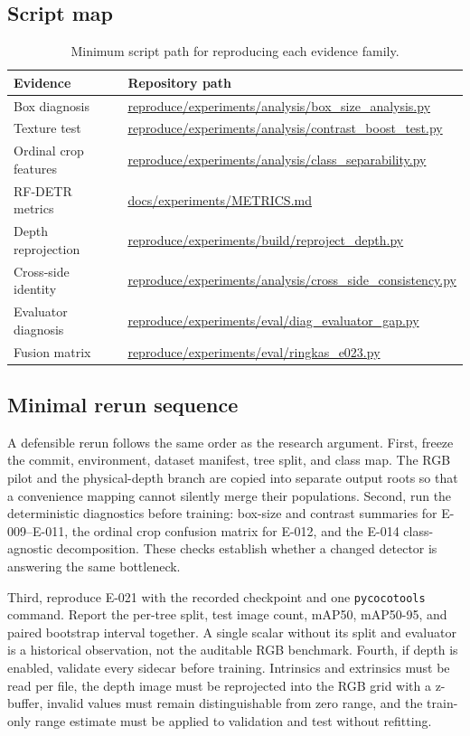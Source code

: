 \documentclass[preprint,12pt]{elsarticle}
\newcommand{\pathcode}[1]{\scriptsize\url{#1}}
\begin{document}
\subsection{Script map}
\begin{table}[H]
\centering
\caption{Minimum script path for reproducing each evidence family.}
\label{tab:scripts}
\begin{tabular}{L{0.37\columnwidth}L{0.51\columnwidth}}
\toprule
Evidence & Repository path\\
\midrule
Box diagnosis & \pathcode{reproduce/experiments/analysis/box_size_analysis.py}\\
Texture test & \pathcode{reproduce/experiments/analysis/contrast_boost_test.py}\\
Ordinal crop features & \pathcode{reproduce/experiments/analysis/class_separability.py}\\
RF-DETR metrics & \pathcode{docs/experiments/METRICS.md}\\
Depth reprojection & \pathcode{reproduce/experiments/build/reproject_depth.py}\\
Cross-side identity & \pathcode{reproduce/experiments/analysis/cross_side_consistency.py}\\
Evaluator diagnosis & \pathcode{reproduce/experiments/eval/diag_evaluator_gap.py}\\
Fusion matrix & \pathcode{reproduce/experiments/eval/ringkas_e023.py}\\
\bottomrule
\end{tabular}
\end{table}

\subsection{Minimal rerun sequence}

A defensible rerun follows the same order as the research argument. First,
freeze the commit, environment, dataset manifest, tree split, and class map.
The RGB pilot and the physical-depth branch are copied into separate output
roots so that a convenience mapping cannot silently merge their populations.
Second, run the deterministic diagnostics before training: box-size and
contrast summaries for E-009--E-011, the ordinal crop confusion matrix for
E-012, and the E-014 class-agnostic decomposition. These checks establish
whether a changed detector is answering the same bottleneck.

Third, reproduce E-021 with the recorded checkpoint and one
\texttt{pycocotools} command. Report the per-tree split, test image count,
mAP50, mAP50-95, and paired bootstrap interval together. A single scalar
without its split and evaluator is a historical observation, not the auditable
RGB benchmark. Fourth, if depth is enabled, validate every sidecar before
training. Intrinsics and extrinsics must be read per file, the depth image
must be reprojected into the RGB grid with a z-buffer, invalid values must
remain distinguishable from zero range, and the train-only range estimate
must be applied to validation and test without refitting.
\end{document}
